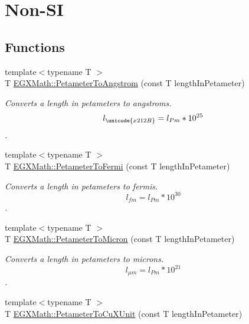 \hypertarget{group___e_g_x_math-_conversions-_length_conversions-_petameter-_non-_s_i}{}\section{Non-\/\+SI}
\label{group___e_g_x_math-_conversions-_length_conversions-_petameter-_non-_s_i}
\subsection*{Functions}
\begin{DoxyCompactItemize}
\item 
{\footnotesize template$<$typename T $>$ }\\T \mbox{\hyperlink{group___e_g_x_math-_conversions-_length_conversions-_petameter-_non-_s_i_ga2acc301b8b78a80d23a150da8cba3814}{E\+G\+X\+Math\+::\+Petameter\+To\+Angstrom}} (const T length\+In\+Petameter)
\begin{DoxyCompactList}\small\item\em Converts a length in petameters to angstroms. \[ l_{\unicode{x212B}}=l_{Pm} * 10^{25} \]. \end{DoxyCompactList}\item 
{\footnotesize template$<$typename T $>$ }\\T \mbox{\hyperlink{group___e_g_x_math-_conversions-_length_conversions-_petameter-_non-_s_i_gaba0fd76c76316722eb49006d032fa493}{E\+G\+X\+Math\+::\+Petameter\+To\+Fermi}} (const T length\+In\+Petameter)
\begin{DoxyCompactList}\small\item\em Converts a length in petameters to fermis. \[ l_{fm}=l_{Pm} * 10^{30} \]. \end{DoxyCompactList}\item 
{\footnotesize template$<$typename T $>$ }\\T \mbox{\hyperlink{group___e_g_x_math-_conversions-_length_conversions-_petameter-_non-_s_i_gad1c1c26c232339c6304962d20cb29252}{E\+G\+X\+Math\+::\+Petameter\+To\+Micron}} (const T length\+In\+Petameter)
\begin{DoxyCompactList}\small\item\em Converts a length in petameters to microns. \[ l_{\mu m}=l_{Pm} * 10^{21} \]. \end{DoxyCompactList}\item 
{\footnotesize template$<$typename T $>$ }\\T \mbox{\hyperlink{group___e_g_x_math-_conversions-_length_conversions-_petameter-_non-_s_i_gad9b37964189c5963e4c634122fd763fe}{E\+G\+X\+Math\+::\+Petameter\+To\+Cu\+X\+Unit}} (const T length\+In\+Petameter)

\end{DoxyCompactItemize}
